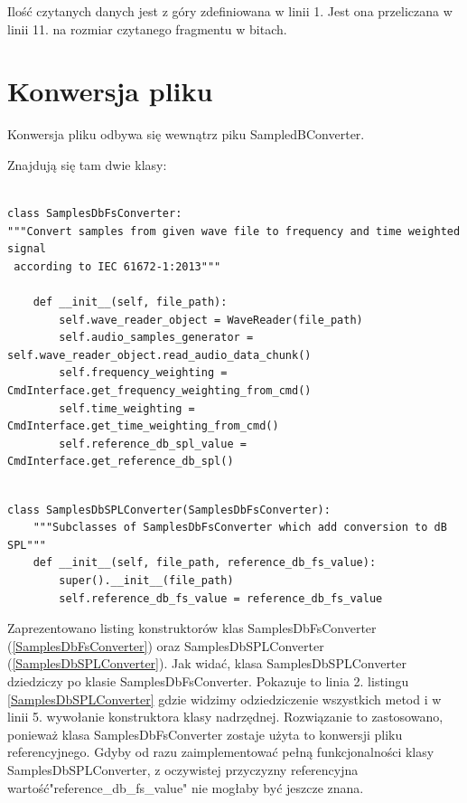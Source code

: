 \documentclass[eng,printmode]{mgr}
\begin{document}
Ilość czytanych danych jest z góry zdefiniowana w linii 1. Jest ona przeliczana w linii 11. na rozmiar czytanego fragmentu w bitach. 

\section{Konwersja pliku}
Konwersja pliku odbywa się wewnątrz piku SampledBConverter. 

Znajdują się tam dwie klasy:

\begin{minipage}{\linewidth}
\begin{lstlisting}[caption={Fragment kodu źródłowego pliku SampledBConverter.py,\newline klasa SamplesDbFSConverter},captionpos=b,label={SamplesDbFsConverter}]

class SamplesDbFsConverter:
"""Convert samples from given wave file to frequency and time weighted signal
 according to IEC 61672-1:2013"""

    def __init__(self, file_path):
        self.wave_reader_object = WaveReader(file_path)
        self.audio_samples_generator = self.wave_reader_object.read_audio_data_chunk()
        self.frequency_weighting = CmdInterface.get_frequency_weighting_from_cmd()
        self.time_weighting = CmdInterface.get_time_weighting_from_cmd()
        self.reference_db_spl_value = CmdInterface.get_reference_db_spl()
\end{lstlisting}
\end{minipage}

\begin{minipage}{\linewidth}
\begin{lstlisting}[caption={Fragment kodu źródłowego pliku SampledBConverter.py,\newline klasa SamplesDbSPLConverter},captionpos=b,label={SamplesDbSPLConverter}]

class SamplesDbSPLConverter(SamplesDbFsConverter):
    """Subclasses of SamplesDbFsConverter which add conversion to dB SPL"""
    def __init__(self, file_path, reference_db_fs_value):
        super().__init__(file_path)
        self.reference_db_fs_value = reference_db_fs_value

\end{lstlisting}
\end{minipage}

Zaprezentowano listing konstruktorów klas SamplesDbFsConverter (\ref{SamplesDbFsConverter}) oraz  SamplesDbSPLConverter (\ref{SamplesDbSPLConverter}). Jak widać, klasa SamplesDbSPLConverter dziedziczy po klasie SamplesDbFsConverter. Pokazuje to linia 2. listingu \ref{SamplesDbSPLConverter} gdzie widzimy odziedziczenie wszystkich metod i w linii 5. wywołanie konstruktora klasy nadrzędnej. Rozwiązanie to zastosowano, ponieważ klasa SamplesDbFsConverter zostaje użyta to konwersji pliku referencyjnego. Gdyby od razu zaimplementować pełną funkcjonalności klasy SamplesDbSPLConverter, z oczywistej przyczyzny referencyjna wartość\newline "reference\_db\_fs\_value" nie mogłaby być jeszcze znana. 
\end{document}
